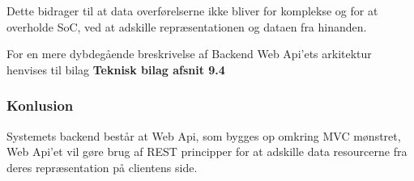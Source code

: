 \noindent Dette bidrager til at data overførelserne ikke bliver for komplekse og for at overholde SoC, ved at adskille repræsentationen og dataen fra hinanden.

For en mere dybdegående breskrivelse af Backend Web Api'ets arkitektur henvises til bilag \textbf{Teknisk bilag afsnit 9.4}

\subsubsection{Konlusion}

Systemets backend består at Web Api, som bygges op omkring MVC mønstret, Web Api’et vil gøre brug af REST principper for at adskille data resourcerne fra deres repræsentation på clientens side.

\newpage
